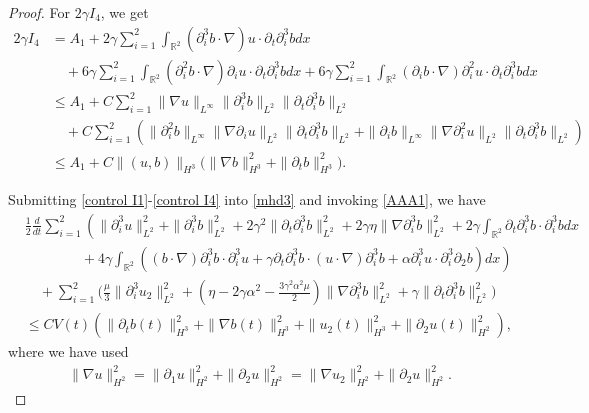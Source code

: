 \documentclass[10pt,a4paper]{amsart}
\def\R{\mathbb R}
\begin{document}
\begin{proof}
\par For $2\gamma I_4$, we get
 \begin{align}
2\gamma I_4&=
A_{1}+2\gamma\sum_{i=1}^2\int_{\R^2}(\partial_i^3b\cdot\nabla) u\cdot\partial_t\partial_i^3 bdx\nonumber\\
&\quad+6\gamma\sum_{i=1}^2\int_{\R^2}(\partial_i^2b\cdot\nabla)\partial_i u\cdot\partial_t\partial_i^3 bdx+6\gamma\sum_{i=1}^2\int_{\R^2}(\partial_i b\cdot\nabla)\partial_i^2 u\cdot\partial_t\partial_i^3 bdx\nonumber\\ &\leq
A_1+C\sum_{i=1}^2
\|\nabla u\|_{L^{\infty}}\|\partial_i^3 b\|_{L^2}\|\partial_t\partial_i^3b\|_{L^2}\nonumber\\
&\quad
+C\sum_{i=1}^2(\|\partial_i^2 b\|_{L^{\infty}}\|\nabla\partial_iu\|_{L^2}\|\partial_t\partial_i^3b\|_{L^2}+\|\partial_i b\|_{L^{\infty}}\|\nabla\partial_i^2u\|_{L^2}\|\partial_t\partial_i^3b\|_{L^2})\nonumber\\
&\leq A_1+C\|(u,b)\|_{H^3}\big(\|\nabla b\|_{H^3}^2+\|\partial_{t}b\|_{H^3}^2\big).\label{control I4}
\end{align}
\par




Submitting \eqref{control I1}-\eqref{control I4} into \eqref{mhd3} and invoking \eqref{AAA1}, we have
\begin{align}\label{mhd32}
&\frac{1}{2}\frac{d}{dt}\sum_{i=1}^2\left(\|\partial_i^3 u\|^2_{L^2}+\|\partial_i^3 b\|^2_{L^2}+2\gamma^2\|\partial_t\partial_i^3b\|^2_{L^2}
+2\gamma\eta\|\nabla\partial_i^3 b\|^2_{L^2}+2\gamma\int_{\R^2}\partial_t\partial_i^3b\cdot\partial_i^3bdx\right.\nonumber\\
&\left.\qquad\qquad+4\gamma\int_{\R^2}\left((b\cdot\nabla)\partial_i^3 b\cdot\partial_i^3 u+\gamma\partial_{t}\partial_i^3b\cdot (u\cdot\nabla)\partial_i^3 b+\alpha\partial_i^3u\cdot\partial_i^3\partial_2 b\right)dx\right)\nonumber\\
&\quad+\sum_{i=1}^2\bigg(\frac{\mu}{3}\|\partial_i^3u_2\|^2_{L^2}+(\eta-2\gamma\alpha^2-\frac{3\gamma^2\alpha^2\mu}{2})\|\nabla \partial_i^3b\|^2_{L^2}+\gamma\|\partial_{t}\partial_i^3b\|^2_{L^2}\bigg)\nonumber\\
&\leq CV(t)\left(\|\partial_{t} b(t)\|_{H^3}^2+\|\nabla b(t)\|_{H^3}^2+\|u_2(t)\|_{H^3}^2+\|\partial_{2}u(t)\|_{H^2}^2\right),
\end{align}
where we have used \begin{align*}\|\nabla u\|_{H^2}^2=\|\partial_1 u\|_{H^2}^2+\|\partial_2 u\|_{H^2}^2=\| \nabla u_2\|_{H^2}^2+\|\partial_2 u\|_{H^2}^2.\end{align*}


\end{proof}
\end{document}
